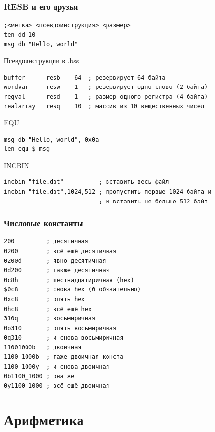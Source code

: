 \documentclass[utf8, russian]{beamer}
\begin{document}
    \begin{frame}[fragile]
        \frametitle{RESB и его друзья}\small
        \begin{verbatim}
;<метка> <псевдоинструкция> <размер> 
ten dd 10 
msg db "Hello, world"\end{verbatim}
        \begin{block}{Псевдоинструкции в .bss}
            \begin{verbatim}
buffer      resb    64  ; резервирует 64 байта
wordvar     resw    1   ; резервирует одно слово (2 байта)
regval      resd    1   ; размер одного регистра (4 байта)
realarray   resq    10  ; массив из 10 вещественных чисел\end{verbatim}
        \end{block}
        \begin{block}{EQU}
        \begin{verbatim}
msg db "Hello, world", 0x0a
len equ $-msg\end{verbatim}
        \end{block}
        \begin{block}{INCBIN}
        \begin{verbatim}
incbin "file.dat"          ; вставить весь файл
incbin "file.dat",1024,512 ; пропустить первые 1024 байта и
                           ; и вставить не больше 512 байт\end{verbatim}
        \end{block}
\end{frame}
    \begin{frame}[fragile]
        \frametitle{Числовые константы}
        \begin{verbatim}
200         ; десятичная
0200        ; всё ешё десятичная
0200d       ; явно десятичная
0d200       ; также десятичная
0c8h        ; шестнадцатиричная (hex)
$0c8        ; снова hex (0 обязательно)
0xc8        ; опять hex
0hc8        ; всё ещё hex
310q        ; восьмиричная
0o310       ; опять восьмиричная
0q310       ; и снова восьмиричная
11001000b   ; двоичная
1100_1000b  ; таже двоичная конста
1100_1000y  ; и снова двоичная
0b1100_1000 ; она же
0y1100_1000 ; всё ещё двоичная       
        \end{verbatim}
\end{frame}

    \section{Арифметика}
\end{document}
